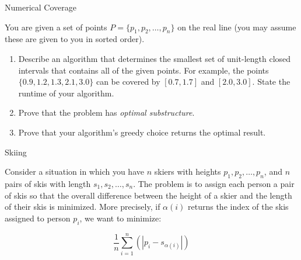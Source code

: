 \documentclass[10pt]{article}
\begin{document}
\thispagestyle{empty}
\handout



\begin{problem} Numerical Coverage \end{problem}

You are given a set of points $P= \{ p_1, p_2, \ldots, p_n \}$ on the real line (you may assume these are given to you in sorted order). 

\begin{enumerate}

  \item Describe an algorithm that determines the smallest set of unit-length closed intervals that contains all of the given points. For example, the points $\{0.9,1.2,1.3,2.1,3.0\}$ can be covered by $[0.7,1.7]$ and $[2.0,3.0]$. State the runtime of your algorithm.



  \solution{
  }
  


  \item Prove that the problem has {\em optimal substructure}.

  \solution{
  }
  


  \item Prove that your algorithm's greedy choice returns the optimal result.

  \solution{
  }

\end{enumerate}




\begin{problem} Skiing \end{problem}

Consider a situation in which you have $n$ skiers with heights $p_1, p_2, \ldots, p_n$, and $n$ pairs of skis with length $s_1, s_2, \ldots, s_n$. The problem is to assign each person a pair of skis so that the overall difference between the height of a skier and the length of their skis is minimized. More precisely, if $\alpha(i)$ returns the index of the skis assigned to person $p_i$, we want to minimize:

\[ \frac{1}{n} \sum_{i=1}^{n} \left( \left| p_i - s_{\alpha(i)} \right| \right) \]
\end{document}
